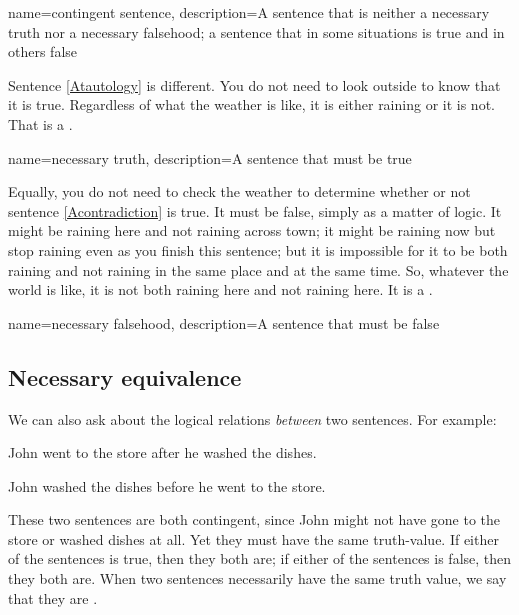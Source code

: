 {
name=contingent sentence,
description={A sentence that is neither a \gls{necessary truth} nor a \gls{necessary falsehood}; a sentence that in some situations is true and in others false}
}

Sentence \ref{Atautology} is different. You do not need to look outside to know that it is true. Regardless of what the weather is like, it is either raining or it is not. That is a . 

{
name={necessary truth},
description={A sentence that must be true}
}

Equally, you do not need to check the weather to determine whether or not sentence \ref{Acontradiction} is true. It must be false, simply as a matter of logic. It might be raining here and not raining across town; it might be raining now but stop raining even as you finish this sentence; but it is impossible for it to be both raining and not raining in the same place and at the same time. So, whatever the world is like, it is not both raining here and not raining here. It is a .

{
name={necessary falsehood},
description={A sentence that must be false}
}


\subsection{Necessary equivalence}

We can also ask about the logical relations \emph{between} two sentences. For example:
\begin{earg}
\item[] John went to the store after he washed the dishes.
\item[] John washed the dishes before he went to the store.
\end{earg}
These two sentences are both contingent, since John might not have gone to the store or washed dishes at all. Yet they must have the same truth-value. If either of the sentences is true, then they both are; if either of the sentences is false, then they both are. When two sentences necessarily have the same truth value, we say that they are .

